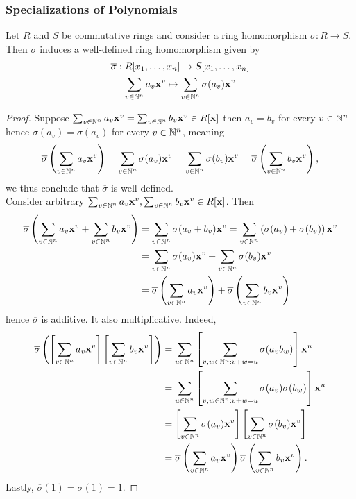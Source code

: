 \subsubsection{Specializations of Polynomials}
\begin{proposition}
    Let $R$ and $S$ be commutative rings and consider a ring homomorphism $\sigma : R \rightarrow S$. Then $\sigma$ induces a well-defined ring homomorphism given by
    \begin{gather*}
        \overline{\sigma} : R[x_1,\dots,x_n]\rightarrow S[x_1,\dots,x_n]\\
        \sum_{v\in \mathbb{N}^n} a_v\mathbf{x}^v \mapsto \sum_{v\in \mathbb{N}^n}\sigma(a_v)\mathbf{x}^v
    \end{gather*}
\end{proposition}
\begin{proof}
    Suppose $\sum_{v\in \mathbb{N}^n} a_v\mathbf{x}^v = \sum_{v\in \mathbb{N}^n} b_v\mathbf{x}^v\in R[\mathbf{x}]$ then $a_v=b_v$ for every $v\in \mathbb{N}^n$ hence $\sigma(a_v)=\sigma(a_v)$ for every $v\in \mathbb{N}^n$, meaning 
    $$\overline{\sigma}\left(\sum_{v\in \mathbb{N}^n} a_v\mathbf{x}^v\right)=\sum_{v\in \mathbb{N}^n } \sigma(a_v)\mathbf{x}^v= \sum_{v\in \mathbb{N}^n } \sigma(b_v)\mathbf{x}^v = \overline{\sigma}\left(\sum_{v\in\mathbb{N}^n}b_v\mathbf{x}^v\right),$$
    we thus conclude that $\overline{\sigma}$ is well-defined.\\
    Consider arbitrary $\sum_{v\in \mathbb{N}^n} a_v\mathbf{x}^v, \sum_{v\in \mathbb{N}^n} b_v\mathbf{x}^v\in R[\mathbf{x}]$. Then 
    \begin{align*}
        \overline{\sigma}\left(\sum_{v\in \mathbb{N}^n} a_v\mathbf{x}^v + \sum_{v\in \mathbb{N}^n}b_v\mathbf{x}^v\right) &= \sum_{v\in \mathbb{N}^n} \sigma(a_v+b_v)\mathbf{x}^v = \sum_{v\in \mathbb{N}^n} \left(\sigma(a_v)+\sigma(b_v)\right) \mathbf{x}^v\\
        &=\sum_{v\in \mathbb{N}^n} \sigma(a_v)\mathbf{x}^v + \sum_{v\in \mathbb{N}^n} \sigma(b_v)\mathbf{x}^v\\ &= \overline{\sigma}\left(\sum_{v\in\mathbb{N}^n} a_v\mathbf{x}^v\right)+\overline{\sigma}\left(\sum_{v\in\mathbb{N}^n} b_v\mathbf{x}^v\right)
    \end{align*}
    hence $\overline{\sigma}$ is additive. It also multiplicative. Indeed,
    \begin{align*}
        \overline{\sigma}\left(\left[\sum_{v\in\mathbb{N}^n} a_v\mathbf{x}^v\right]\left[ \sum_{v\in\mathbb{N}^n} b_v\mathbf{x}^v\right]\right) &= \sum_{u\in \mathbb{N}^n}\left[\sum_{v,w\in \mathbb{N}^n : v+w=u} \sigma(a_vb_w)\right] \mathbf{x}^u\\ 
        &= \sum_{u\in \mathbb{N}^n}\left[\sum_{v,w\in \mathbb{N}^n : v+w=u}\sigma(a_v)\sigma(b_w)\right] \mathbf{x}^u\\
        &=\left[\sum_{v\in\mathbb{N}^n} \sigma(a_v)\mathbf{x}^v\right]\left[ \sum_{v\in\mathbb{N}^n} \sigma(b_v)\mathbf{x}^v\right]\\
        &= \overline{\sigma}\left(\sum_{v\in\mathbb{N}^n} a_v\mathbf{x}^v\right)\overline{\sigma}\left(\sum_{v\in\mathbb{N}^n} b_v\mathbf{x}^v\right).
    \end{align*}
    Lastly, $\overline{\sigma}(1)=\sigma(1)=1$.
\end{proof}
